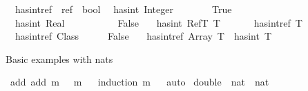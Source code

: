 \begin{isabellebody}
\ \ has{\isacharunderscore}{\kern0pt}int{\isacharunderscore}{\kern0pt}ref\ {\isacharcolon}{\kern0pt}{\isacharcolon}{\kern0pt}\ {\isachardoublequoteopen}ref\ {\isasymRightarrow}\ bool{\isachardoublequoteclose}\isanewline
{}\isanewline
\ \ {\isachardoublequoteopen}has{\isacharunderscore}{\kern0pt}int\ Integer\ \ \ \ \ \ \ {\isacharequal}{\kern0pt}\ True{\isachardoublequoteclose}\ {\isacharbar}{\kern0pt}\isanewline
\ \ {\isachardoublequoteopen}has{\isacharunderscore}{\kern0pt}int\ Real\ \ \ \ \ \ \ \ \ \ {\isacharequal}{\kern0pt}\ False{\isachardoublequoteclose}\ {\isacharbar}{\kern0pt}\isanewline
\ \ {\isachardoublequoteopen}has{\isacharunderscore}{\kern0pt}int\ {\isacharparenleft}{\kern0pt}RefT\ T{\isacharparenright}{\kern0pt}\ \ \ \ \ \ {\isacharequal}{\kern0pt}\ has{\isacharunderscore}{\kern0pt}int{\isacharunderscore}{\kern0pt}ref\ T{\isachardoublequoteclose}\ {\isacharbar}{\kern0pt}\isanewline
\isanewline
\ \ {\isachardoublequoteopen}has{\isacharunderscore}{\kern0pt}int{\isacharunderscore}{\kern0pt}ref\ Class\ \ \ \ \ {\isacharequal}{\kern0pt}\ False{\isachardoublequoteclose}\ {\isacharbar}{\kern0pt}\isanewline
\ \ {\isachardoublequoteopen}has{\isacharunderscore}{\kern0pt}int{\isacharunderscore}{\kern0pt}ref\ {\isacharparenleft}{\kern0pt}Array\ T{\isacharparenright}{\kern0pt}\ {\isacharequal}{\kern0pt}\ has{\isacharunderscore}{\kern0pt}int\ T{\isachardoublequoteclose}\isanewline
\isanewline
%
\isamarkupcmt{------------------------------------------------------------%
}%
\isadelimdocument
%
\endisadelimdocument
%
\isatagdocument
%
\isamarkuptrue%
%
\endisatagdocument
{\isafolddocument}%
%
\isadelimdocument
%
\endisadelimdocument
%
\begin{isamarkuptext}%
Basic examples with nats%
\end{isamarkuptext}\isamarkuptrue%
\isamarkupfalse%
\ add{\isacharunderscore}{\kern0pt}{}{}{\isacharcolon}{\kern0pt}\ {\isachardoublequoteopen}add\ m\ {}\ {\isacharequal}{\kern0pt}\ m{\isachardoublequoteclose}\isanewline
%
\isadelimproof
\ \ %
\endisadelimproof
%
\isatagproof
{}\isamarkupfalse%
{\isacharparenleft}{\kern0pt}induction\ m{\isacharparenright}{\kern0pt}\isanewline
\ \ \isamarkupfalse%
{\isacharparenleft}{\kern0pt}auto{\isacharparenright}{\kern0pt}\isanewline
{}\isamarkupfalse%
%
\endisatagproof
{\isafoldproof}%
%
\isadelimproof
\isanewline
%
\endisadelimproof
\isanewline
{}\isamarkupfalse%
\ double\ {\isacharcolon}{\kern0pt}{\isacharcolon}{\kern0pt}\ {\isachardoublequoteopen}nat\ {\isasymRightarrow}\ nat{\isachardoublequoteclose}\ \isanewline

\end{isabellebody}

